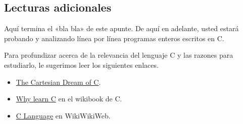 \subsection{Lecturas adicionales}

Aquí termina el «bla bla» de este apunte. De aquí en adelante, usted
estará probando y analizando línea por línea programas enteros escritos
en C.

Para profundizar acerca de la relevancia del lenguaje C y las razones
para estudiarlo, le sugerimos leer los siguientes enlaces.

\begin{itemize}
\item
  \href{http://c.learncodethehardway.org/book/learn-c-the-hard-wayli3.html}{The
  Cartesian Dream of C}.
\item
  \href{http://en.wikibooks.org/wiki/C\_Programming/Why\_learn\_C\%3F}{Why
  learn C} en el wikibook de C.
\item
  \href{http://c2.com/cgi/wiki?CeeLanguage}{C Language} en WikiWikiWeb.
\end{itemize}
